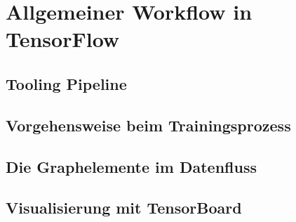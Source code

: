 \chapter{Allgemeiner Workflow in TensorFlow}





\section{Tooling Pipeline}



\section{Vorgehensweise beim Trainingsprozess}



\section{Die Graphelemente im Datenfluss}




\section{Visualisierung mit TensorBoard}

